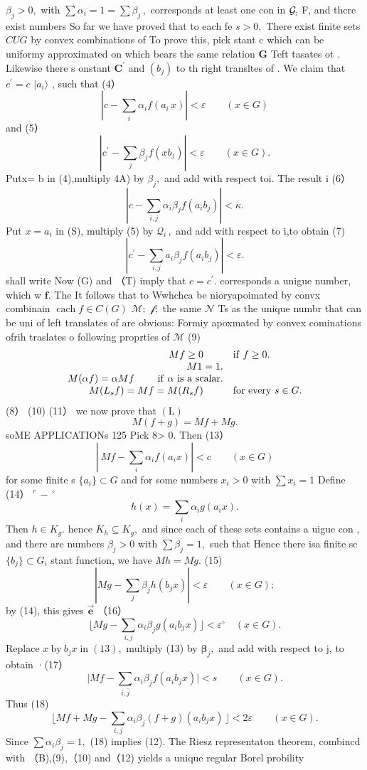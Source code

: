 $\beta_{j}>0,$ with $\textstyle\sum\alpha_{i}=1=\sum\beta_{j}\,,$ corresponds at least one con in ${\cal G}_{;}$ F, and thcre exist numbers So far we have proved that to each fe $s>0,$ There exist finite sets ${\mathit{C U G}}$ by convex combinations of To prove this, pick stant c which can be uniformy approximated on which bears the same relation ${\boldsymbol{G}}$ Teft tasates ot . Likewise there s onstant ${\boldsymbol{C}}^{\prime}$ and $(b_{j})$ to th right transltes of . We claim that $c^{\prime}=c$ $\textstyle|a_{i}\rangle$ , such that (4） $$ |c-\sum_{i}\alpha_{i}f(a_{i}\,x)|<\varepsilon\qquad(x\in G) $$ and (5） $$ \left|c^{\prime}-\sum_{j}\beta_{j}f(x b_{j})\right|<\varepsilon\qquad(x\in G). $$ Putx= b in (4),multiply 4A) by $\beta_{j},$ and add with respect toi. The result i (6） $$ |c-\sum_{i,j}\alpha_{i}\beta_{j}f(a_{i}b_{j})|<\kappa. $$ Put $x=a_{i}$ in (S), multiply (5) by ${\mathcal{Q}}_{i}\,,$ and add with respect to i,to obtain (7) $$ |c^{\prime}-\sum_{i,j}a_{i}\beta_{j}f(a_{i}b_{j})|<\varepsilon. $$ shall write Now (G) and （T) imply that $c=c^{\prime}.$ corresponds a unigue number, which w ${\boldsymbol{f}}.$ The It follows that to Wwhchca be nioryapoimated by convx combinain $\operatorname{cach}f\in C(G)$ ${\mathcal{M}};$ ${\mathcal{f}};$ the same ${\mathcal{N}}$ Ts as the unique numbr that can be uni of left translates of are obvious: Formiy apoxmated by convex cominations ofrih traslates o following proprties of $\mathcal{M}$ (9) $$ \begin{array}{r l}{{M f\geq0\qquad}}&{{\mathrm{if~}}f\geq0.}\\ {{M1=1.}}&{{\qquad}}\\ {{M(\alpha f)=\alpha M f\qquad}{\mathrm{~if~}}\alpha{\mathrm{~is~a~scalar.}}}\\ {{M(L_{s}f)=M f=M(R_{s}f)\qquad}}&{{\mathrm{for~every~}s\in G.}}\end{array} $$ (8） (10) (11） we now prove that ${\mathrm{(L)}}$ $$ M(f+g)=M f+M g. $$soME APPLICATIONs 125 Pick 8> 0. Then (13） $$ \left|\ M f-\sum_{i}\alpha_{i}f(a_{i}x)\right|<c\qquad(x\in G) $$ for some finite s $\{a_{i}\}\subset G$ and for some numbers $x_{i}>0$ with $\sum x_{i}=1$ Define (14） $^{r}\,-\,{}^{\circ}$ $$ h(x)=\sum_{i}\alpha_{i}g(a_{i}x). $$ Then $h\in K_{g}.$ hence $K_{h}\subseteq K_{g},$ and since each of these sets contains a uigue con , and there are numbers $\beta_{j}>0$ with $\sum\beta_{j}=1,$ such that Hence there isa finite sc $\{b_{j}\}\subset G_{i}$ stant function, we have $M h=M g.$ (15) $$ \left|M g-\sum_{j}\beta_{j}h(b_{j}x)\right|<\varepsilon\qquad(x\in G); $$ by (14), this gives $\mathbf{\vec{e}}$ （16） $$ \Big\lfloor M g-\sum_{i,j}\alpha_{i}\beta_{j}g(a_{i}b_{j}x)\Big\rfloor<\varepsilon^{\circ}\quad(x\in G). $$ Replace $x\ {\mathrm{by}}\ b_{j}x\operatorname{in}\left(13\right),$ multiply (13) by ${\boldsymbol{\beta}}_{j},$ and add with respect to j, to obtain ·(17） $$ \Big\vert M f-\sum_{i,\bar{j}}\alpha_{i}\beta_{j}f(a_{i}b_{j}x)\Big\vert<s\qquad(x\in G). $$ Thus (18) $$ \Big\lfloor M f+M g-\sum_{i,j}\alpha_{i}\beta_{j}(f+g)(a_{i}b_{j}x)\,\Big\rfloor<2\varepsilon\qquad(x\in G). $$ Since $\sum\alpha_{i}\beta_{j}=1,$ (18) implies (12). The Riesz representaton theorem, combincd with （B),(9),（10) and（12) yields a unique regular Borel probility 